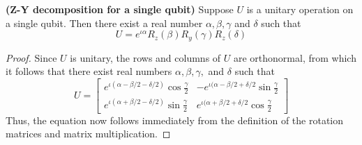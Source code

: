 \begin{theorem}
    \textbf{(Z-Y decomposition for a single qubit)} Suppose $U$ is a unitary operation on a single qubit. Then there exist a real number $\alpha,\beta,\gamma$ and $\delta$ such that
    \[
    U=e^{\iota \alpha} R_z(\beta)R_y(\gamma)R_z(\delta)
    \]
\end{theorem}
\begin{proof}
    Since $U$ is unitary, the rows and columns of $U$ are orthonormal, from which it follows that there exist real numbers $\alpha,\beta,\gamma,$ and $\delta$ such that
    \[
    U=\begin{bmatrix} e^{\iota (\alpha - \beta/2 -\delta/2)} \cos \frac{\gamma}{2} & -e^{\iota (\alpha-\beta/2+\delta/2}\sin\frac{\gamma}{2}\\
    e^{\iota (\alpha+\beta/2-\delta/2)}\sin\frac{\gamma}{2} & e^{\iota(\alpha+\beta/2+\delta/2}\cos \frac{\gamma}{2} \end{bmatrix}
    \]
    Thus, the equation now follows immediately from the definition of the rotation matrices and matrix multiplication.
\end{proof}

